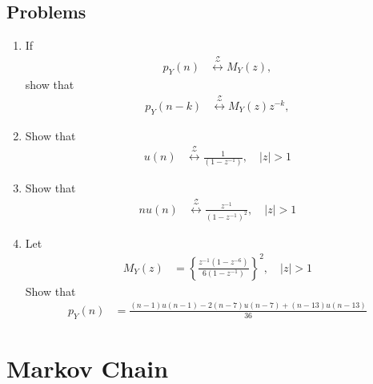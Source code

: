 \documentclass[journal,12pt,onecolumn]{IEEEtran}
\renewcommand\thesection{\arabic{section}}
\renewcommand\thesubsection{\thesection.\arabic{subsection}}
\providecommand{\brak}[1]{\ensuremath{\left(#1\right)}}
\providecommand{\cbrak}[1]{\ensuremath{\left\{#1\right\}}}
\theoremstyle{remark}
\providecommand{\abs}[1]{\left\vert#1\right\vert}
\providecommand{\system}[1]{\overset{\mathcal{#1}}{ \longleftrightarrow}}
\numberwithin{equation}{section}
\begin{document}
\subsection{Problems}
\begin{enumerate}[label=\arabic*.,ref=\thesubsection.\theenumi]
\item If 
\begin{align}
p_Y(n) &\system{Z}M_Y(z), 
\end{align}
	show that
\begin{align}
p_Y(n-k) &\system{Z}M_Y(z)z^{-k},
\end{align}
\item Show that 
\begin{align}
u(n)&\system{Z} \frac{1}{\brak{1-z^{-1}}}, \quad \abs{z} > 1
\end{align}
\item Show that 
\begin{align}
nu(n)&\system{Z} \frac{z^{-1}}{\brak{1-z^{-1}}^2}, \quad \abs{z} > 1
\end{align}

\item Let 
\begin{align}
M_Y(z) &= \cbrak{\frac{z^{-1}\brak{1-z^{-6}}}{6\brak{1-z^{-1}}}}^2, \quad \abs{z} > 1
\label{eq:dice_xzprod}
\end{align}
Show that 
\begin{align}
p_Y(n) &= 
\frac{\brak{n-1}u(n-1) - 2 \brak{n-7}u(n-7)+\brak{n-13}u(n-13)}{36}
\label{eq:dice_xprod}
\end{align}
\end{enumerate}
\section{Markov Chain}
\end{document}
